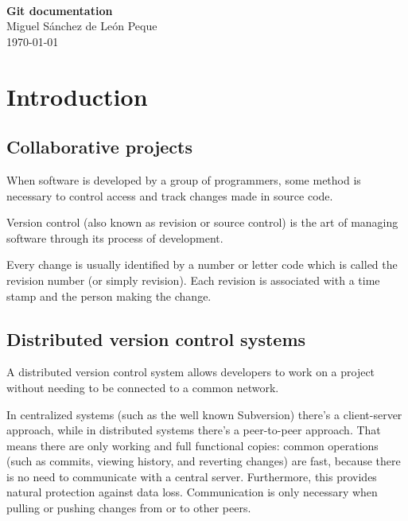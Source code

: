 \documentclass[a4paper,10pt]{article}
\begin{document}
\begin{titlepage}
\begin{center}
	\ \\%
	\vspace{8.0cm}
	\LARGE{\textbf{Git documentation}} \\
	\vspace{1.0cm}
	\Large{Miguel Sánchez de León Peque} \\
	\vspace{0.5cm}
	\large{\today}
\end{center}
\end{titlepage}
\thispagestyle{empty}
\cleardoublepage



\tableofcontents
\cleardoublepage


\listoffigures
\listoftables
\cleardoublepage




\section{Introduction}

\subsection{Collaborative projects}

When software is developed by a group of programmers, some method is
necessary to control access and track changes made in source code.

Version control (also known as revision or source control) is the art of
managing software through its process of development.

Every change is usually identified by a number or letter code which is
called the revision number (or simply revision). Each revision is
associated with a time stamp and the person making the change.

\subsection{Distributed version control systems}

A distributed version control system allows developers to work on a
project without needing to be connected to a common network.

In centralized systems (such as the well known Subversion) there's a
client-server approach, while in distributed systems there's a
peer-to-peer approach. That means there are only working and full
functional copies: common operations (such as commits, viewing history,
and reverting changes) are fast, because there is no need to communicate
with a central server. Furthermore, this provides natural protection
against data loss. Communication is only necessary when pulling or
pushing changes from or to other peers.
\end{document}
